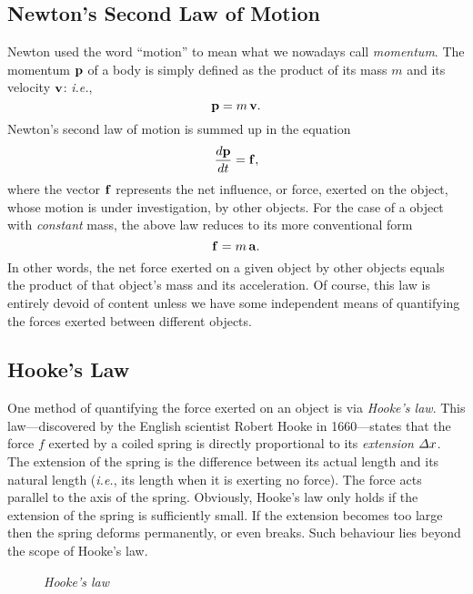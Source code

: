 \subsection{Newton's Second Law of Motion}\label{moment}
Newton used the word ``motion'' to mean what we nowadays call {\em momentum}. The
momentum ${\bf p}$ of a body is simply defined as the product of its mass $m$ and its
velocity ${\bf v}$: {\em i.e.}, 
\begin{equation}
{\bf p} = m\,{\bf v}.
\end{equation}
Newton's second law of motion is summed up in the equation
\begin{equation}
\frac{d{\bf p}}{dt} = {\bf f},
\end{equation}
where the vector ${\bf f}$ represents the net influence, or force, exerted on the object, whose
motion is under investigation,
by other objects.
For the case of a object with {\em constant} mass, the above law reduces to its more conventional
form
\begin{equation}\label{en2}
{\bf f} = m\,{\bf a}.
\end{equation}
In other words, the net force exerted on a given object  by other objects equals the product of that object's
mass and its acceleration. Of course, this law is entirely devoid of content unless we have
some independent means of quantifying the forces exerted between different objects. 

\subsection{Hooke's Law}
One method of quantifying the force exerted on an object is via {\em Hooke's law}. 
This law---discovered by the English scientist Robert Hooke in 1660---states that the
force $f$ exerted by a coiled spring is directly proportional to its {\em extension}  
${\mit\Delta}x$. The extension of the spring is the difference between its actual
length and its natural length ({\em i.e.}, its length when it is exerting no force).
The force acts parallel to the axis of the spring. Obviously, Hooke's law
only holds if the extension of the spring is sufficiently small. If the extension
becomes too large then the spring  deforms permanently, or even breaks. Such behaviour
lies beyond the scope of Hooke's law. 

\begin{figure}
\epsfysize=1.5in
\centerline{}
\caption{\em Hooke's law}\label{f21}   
\end{figure}

